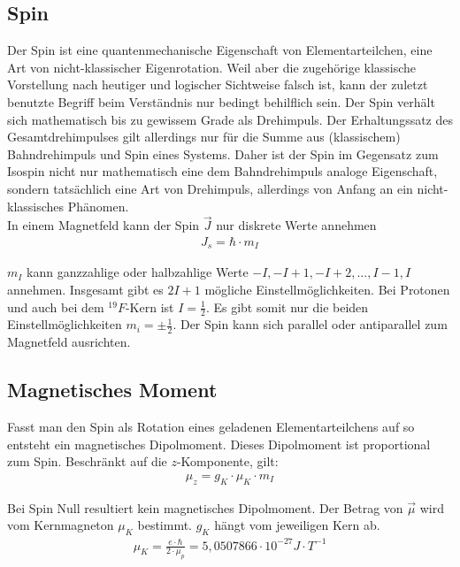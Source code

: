 \documentclass[12pt]{article}
\begin{document}
\subsection{Spin}
Der Spin ist eine quantenmechanische Eigenschaft von Elementarteilchen, eine Art von nicht-klassischer Eigenrotation. Weil aber die zugehörige klassische Vorstellung nach heutiger und logischer Sichtweise falsch ist, kann der zuletzt benutzte Begriff beim Verständnis nur bedingt behilflich sein. Der Spin verhält sich mathematisch bis zu gewissem Grade als Drehimpuls. Der Erhaltungssatz des Gesamtdrehimpulses gilt allerdings nur für die Summe aus (klassischem) Bahndrehimpuls und Spin eines Systems. Daher ist der Spin im Gegensatz zum Isospin nicht nur mathematisch eine dem Bahndrehimpuls analoge Eigenschaft, sondern tatsächlich eine Art von Drehimpuls, allerdings von Anfang an ein nicht-klassisches Phänomen.\\

In einem Magnetfeld kann der Spin $\vec{J}$ nur diskrete Werte annehmen
\begin{align}
 J_s = \hbar \cdot m_{I}
\end{align}

$m_I$ kann ganzzahlige oder halbzahlige Werte $-I, -I+1, -I+2, ..., I-1, I$ annehmen. Insgesamt gibt es $2I+1$ mögliche Einstellmöglichkeiten. Bei Protonen und auch bei dem $^{19} F$-Kern ist $I = \frac{1}{2}$. Es gibt somit nur die beiden Einstellmöglichkeiten $m_i = \pm \frac{1}{2}$. Der Spin kann sich parallel oder antiparallel zum Magnetfeld ausrichten.

\subsection{Magnetisches Moment}
Fasst man den Spin als Rotation eines geladenen Elementarteilchens auf so entsteht ein magnetisches Dipolmoment. Dieses Dipolmoment ist proportional zum Spin. Beschränkt auf die $z$-Komponente, gilt:
\begin{align}
\label{spinmoment}
 \mu_z = g_K \cdot \mu_K \cdot m_I
\end{align}

Bei Spin Null resultiert kein magnetisches Dipolmoment. Der Betrag von $\vec\mu$ wird vom Kernmagneton $\mu_K$ bestimmt. $g_K$ hängt vom jeweiligen Kern ab.
\begin{align}
 \mu_K = \frac{e \cdot \hbar}{2 \cdot \mu_p} = 5,0507866 \cdot 10^{-27} J \cdot T^{-1}
\end{align}
\end{document}
